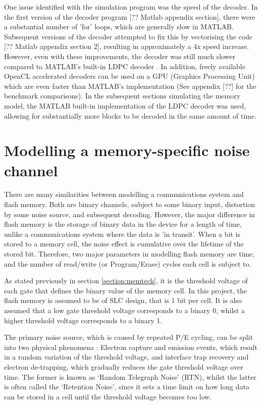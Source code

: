 \documentclass[11pt]{article}
\numberwithin{equation}{subsection}
\begin{document}
One issue identified with the simulation program was the speed of the decoder. In the first version of the decoder program [?? Matlab appendix section], there were a substantial number of 'for' loops, which are generally slow in MATLAB. Subsequent versions of the decoder attempted to fix this by vectorising the code [?? Matlab appendix section 2], resulting in approximately a 4x speed increase. However, even with these improvements, the decoder was still much slower compared to MATLAB's built-in LDPC decoder \cite{matlab-ldpc}. In addition, freely available OpenCL accelerated decoders \cite{openCL} can be used on a GPU (Graphics Processing Unit) which are even faster than MATLAB's implementation (See appendix [??] for the benchmark comparisons). In the subsequent sections simulating the memory model, the MATLAB built-in implementation of the LDPC decoder was used, allowing for substantially more blocks to be decoded in the same amount of time.

\section{Modelling a memory-specific noise channel} \label{section:memory}
There are many similarities between modelling a communications system and flash memory. Both are binary channels, subject to some binary input, distortion by some noise source, and subsequent decoding. However, the major difference in flash memory is the storage of binary data in the device for a length of time, unlike a communications system where the data is 'in transit'. When a bit is stored to a memory cell, the noise effect is cumulative over the lifetime of the stored bit. Therefore, two major parameters in modelling flash memory are time, and the number of read/write (or Program/Erase) cycles each cell is subject to.

As stated previously in section \ref{section:memtech}, it is the threshold voltage of each gate that defines the binary value of the memory cell. In this project, the flash memory is assumed to be of SLC design, that is 1 bit per cell. It is also assumed that a low gate threshold voltage corresponds to a binary 0, whilst a higher threshold voltage corresponds to a binary 1. 

The primary noise source, which is caused by repeated P/E cycling, can be split into two physical phenomena \cite{dong2012estimating}: Electron capture and emission events, which result in a random variation of the threshold voltage, and interface trap recovery and electron de-trapping, which gradually reduces the gate threshold voltage over time. The former is known as `Random Telegraph Noise' (RTN), whilst the latter is often called the `Retention Noise', since it sets a time limit on how long data can be stored in a cell until the threshold voltage becomes too low.
\end{document}
